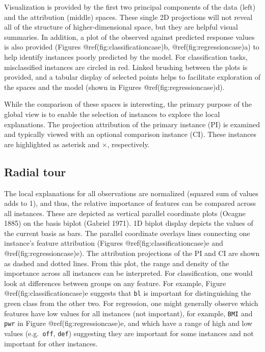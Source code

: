 \documentclass[
]{article}
\begin{document}
Visualization is provided by the first two principal components of the
data (left) and the attribution (middle) spaces. These single 2D
projections will not reveal all of the structure of higher-dimensional
space, but they are helpful visual summaries. In addition, a plot of the
observed against predicted response values is also provided (Figures
@ref(fig:classificationcase)b, @ref(fig:regressioncase)a) to help
identify instances poorly predicted by the model. For classification
tasks, misclassified instances are circled in red. Linked brushing
between the plots is provided, and a tabular display of selected points
helps to facilitate exploration of the spaces and the model (shown in
Figures @ref(fig:regressioncase)d).

While the comparison of these spaces is interesting, the primary purpose
of the global view is to enable the selection of instances to explore
the local explanations. The projection attribution of the primary
instance (PI) is examined and typically viewed with an optional
comparison instance (CI). These instances are highlighted as asterisk
and \(\times\), respectively.

\hypertarget{radial-tour}{%
\subsection{Radial tour}\label{radial-tour}}

The local explanations for all observations are normalized (squared sum
of values adds to 1), and thus, the relative importance of features can
be compared across all instances. These are depicted as vertical
parallel coordinate plots (Ocagne 1885) on the basis biplot (Gabriel
1971). 1D biplot display depicts the values of the current basis as
bars. The parallel coordinate overlays lines connecting one instance's
feature attribution (Figures @ref(fig:classificationcase)e and
@ref(fig:regressioncase)e). The attribution projections of the PI and CI
are shown as dashed and dotted lines. From this plot, the range and
density of the importance across all instances can be interpreted. For
classification, one would look at differences between groups on any
feature. For example, Figure @ref(fig:classificationcase)e suggests that
\texttt{bl} is important for distinguishing the green class from the
other two. For regression, one might generally observe which features
have low values for all instances (not important), for example,
\texttt{BMI} and \texttt{pwr} in Figure @ref(fig:regressioncase)e, and
which have a range of high and low values (e.g.~\texttt{off},
\texttt{def}) suggesting they are important for some instances and not
important for other instances.
\end{document}
